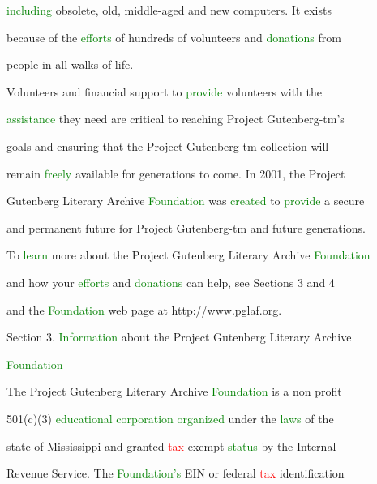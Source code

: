  \textcolor{green}{including} obsolete, old, middle-aged and new computers. It exists

 because of the \textcolor{green}{efforts} of hundreds of \textcolor{BurntOrange}{volunteers} and \textcolor{green}{donations} from

 people in all walks of life.



 \textcolor{BurntOrange}{Volunteers} and financial support to \textcolor{green}{provide} \textcolor{BurntOrange}{volunteers} with the

 \textcolor{green}{assistance} they need are critical to reaching Project Gutenberg-tm's

 goals and ensuring that the Project Gutenberg-tm collection will

 remain \textcolor{green}{freely} available for generations to come. In 2001, the Project

 Gutenberg Literary Archive \textcolor{green}{Foundation} was \textcolor{green}{created} to \textcolor{green}{provide} a secure

 and permanent future for Project Gutenberg-tm and future generations.

 To \textcolor{green}{learn} more about the Project Gutenberg Literary Archive \textcolor{green}{Foundation}

 and how your \textcolor{green}{efforts} and \textcolor{green}{donations} can help, see Sections 3 and 4

 and the \textcolor{green}{Foundation} web page at http://www.pglaf.org.





 Section 3. \textcolor{green}{Information} about the Project Gutenberg Literary Archive

 \textcolor{green}{Foundation}



 The Project Gutenberg Literary Archive \textcolor{green}{Foundation} is a non profit

 501(c)(3) \textcolor{green}{educational} \textcolor{green}{corporation} \textcolor{green}{organized} under the \textcolor{green}{laws} of the

 state of Mississippi and \textcolor{BurntOrange}{granted} \textcolor{red}{tax} exempt \textcolor{green}{status} by the Internal

 Revenue Service. The \textcolor{green}{Foundation's} EIN or federal \textcolor{red}{tax} identification

